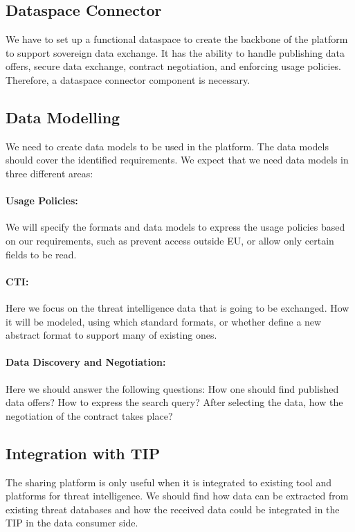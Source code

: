 \documentclass{article}
\begin{document}
\subsection{Dataspace Connector}
We have to set up a functional dataspace to create the backbone of the platform to support sovereign data exchange. It has the ability to handle publishing data offers, secure data exchange, contract negotiation, and enforcing usage policies. Therefore, a dataspace connector component is necessary.

\subsection{Data Modelling}
We need to create data models to be used in the platform. The data models should cover the identified requirements. We expect that we need data models in three different areas:

\paragraph{Usage Policies:} We will specify the formats and data models to express the usage policies based on our requirements, such as prevent access outside EU, or allow only certain fields to be read.

\paragraph*{CTI:} Here we focus on the threat intelligence data that is going to be exchanged. How it will be modeled, using which standard formats, or whether define a new abstract format to support many of existing ones.

\paragraph*{Data Discovery and Negotiation:} Here we should answer the following questions: How one should find published data offers? How to express the search query? After selecting the data, how the negotiation of the contract takes place?

\subsection{Integration with TIP} The sharing platform is only useful when it is integrated to existing tool and platforms for threat intelligence. We should find how data can be extracted from existing threat databases and how the received data could be integrated in the TIP in the data consumer side.
\end{document}
